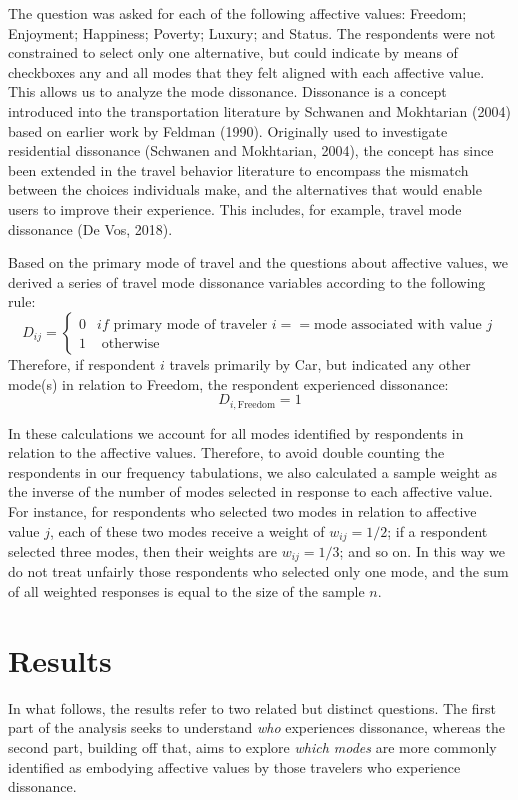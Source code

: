 \documentclass[]{elsarticle} %
\begin{document}
The question was asked for each of the following affective values:
Freedom; Enjoyment; Happiness; Poverty; Luxury; and Status. The
respondents were not constrained to select only one alternative, but
could indicate by means of checkboxes any and all modes that they felt
aligned with each affective value. This allows us to analyze the mode
dissonance. Dissonance is a concept introduced into the transportation
literature by Schwanen and Mokhtarian (2004) based on earlier work by
Feldman (1990). Originally used to investigate residential dissonance
(Schwanen and Mokhtarian, 2004), the concept has since been extended in
the travel behavior literature to encompass the mismatch between the
choices individuals make, and the alternatives that would enable users
to improve their experience. This includes, for example, travel mode
dissonance (De Vos, 2018).

Based on the primary mode of travel and the questions about affective
values, we derived a series of travel mode dissonance variables
according to the following rule: \[
D_{ij} = 
\begin{cases}
0 & if \text{ primary mode of traveler }i == \text{mode associated with value } j\\
1 & \text{ otherwise}
\end{cases}
\] Therefore, if respondent \(i\) travels primarily by Car, but
indicated any other mode(s) in relation to Freedom, the respondent
experienced dissonance: \[
D_{i,\text{Freedom}} = 1
\]

In these calculations we account for all modes identified by respondents
in relation to the affective values. Therefore, to avoid double counting
the respondents in our frequency tabulations, we also calculated a
sample weight as the inverse of the number of modes selected in response
to each affective value. For instance, for respondents who selected two
modes in relation to affective value \(j\), each of these two modes
receive a weight of \(w_{ij}=1/2\); if a respondent selected three
modes, then their weights are \(w_{ij}=1/3\); and so on. In this way we
do not treat unfairly those respondents who selected only one mode, and
the sum of all weighted responses is equal to the size of the sample
\(n\).

\hypertarget{results}{%
\section{Results}\label{results}}

In what follows, the results refer to two related but distinct
questions. The first part of the analysis seeks to understand \emph{who}
experiences dissonance, whereas the second part, building off that, aims
to explore \emph{which modes} are more commonly identified as embodying
affective values by those travelers who experience dissonance.
\end{document}

